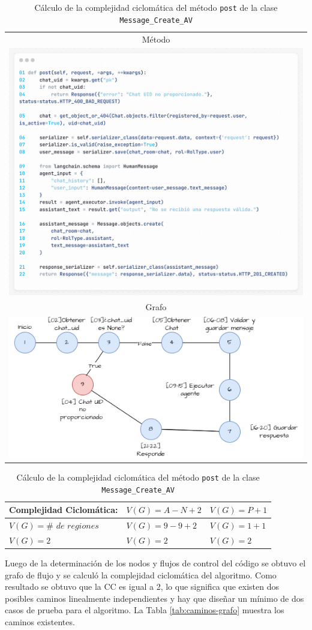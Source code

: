 \begin{table}[h]
	\centering
	\caption{Cálculo de la complejidad ciclomática del método \texttt{post} de la clase \texttt{Message\_Create\_AV}}
	\label{tab:complejidad-ciclomatica}
	\begin{tabular}{|c|}
		\hline
		Método \\
		\includegraphics[width=0.4\linewidth]{images/postCreateMessage.png} \\
		\hline
		Grafo \\
		\includegraphics[width=0.4\linewidth]{images/postMessage.png} \\
		\hline
	\end{tabular}
\end{table}

\begin{table}[H]
	\centering
	\caption{Cálculo de la complejidad ciclomática del método \texttt{post} de la clase \texttt{Message\_Create\_AV}}
	\label{tab:complejidad-ciclomatica2}
	\renewcommand{\arraystretch}{1.5}
	\begin{tabular}{|>{\bfseries}m{5cm}|m{4cm}|m{4cm}|}
		\hline
		Complejidad Ciclomática: & \( V(G) = A - N + 2 \) & \( V(G) = P + 1 \) \\
		\hline
		\( V(G) = \# \textit{ de regiones} \) & \( V(G) = 9 - 9 + 2 \) & \( V(G) = 1 + 1 \) \\
		\hline
		\( V(G) = 2 \) & \( V(G) = 2 \) & \( V(G) = 2 \) \\
		\hline
	\end{tabular}
\end{table}

Luego de la determinación de los nodos y flujos de control del código se obtuvo el grafo de flujo y se calculó la complejidad ciclomática del algoritmo.
Como resultado se obtuvo que la CC es igual a 2, lo que significa que existen dos posibles caminos
linealmente independientes y hay que diseñar un mínimo de dos casos de prueba para el algoritmo. La Tabla \ref{tab:caminos-grafo} muestra los caminos existentes.

